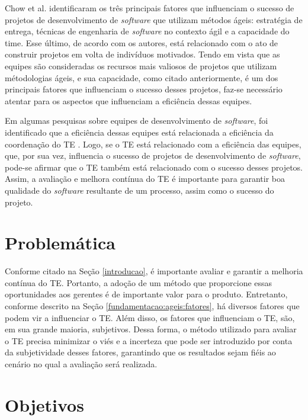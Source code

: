 Chow et al. \cite{chow} identificaram os três principais fatores que influenciam o sucesso de projetos de desenvolvimento de \textit{software} que utilizam métodos ágeis: estratégia de entrega, técnicas de engenharia de \textit{software} no contexto ágil e a capacidade do time. Esse último, de acordo com os autores, está relacionado com o ato de construir projetos em volta de indivíduos motivados. Tendo em vista que as equipes são consideradas os recursos mais valiosos de projetos que utilizam métodologias ágeis, e sua capacidade, como citado anteriormente, é um dos principais fatores que influenciam o sucesso desses projetos, faz-se necessário atentar para os aspectos que influenciam a eficiência dessas equipes.

Em algumas pesquisas sobre equipes de desenvolvimento de \textit{software}, foi identificado que a eficiência dessas equipes está relacionada a eficiência da coordenação do TE \cite{kraut} \cite{hoegl}. Logo, se o TE está relacionado com a eficiência das equipes, que, por sua vez, influencia o sucesso de projetos de desenvolvimento de \textit{software}, pode-se afirmar que o TE também está relacionado com o sucesso desses projetos. Assim, a avaliação e melhora contínua do TE é importante para garantir boa qualidade do \textit{software} resultante de um processo, assim como o sucesso do projeto.

\section{Problemática}
\label{introducao:problematica}

Conforme citado na Seção \ref{introducao}, é importante avaliar e garantir a melhoria contínua do TE. Portanto, a adoção de um método que proporcione essas oportunidades aos gerentes é de importante valor para o produto. Entretanto, conforme descrito na Seção \ref{fundamentacao:ageis:fatores}, há diversos fatores que podem vir a influenciar o TE. Além disso, os fatores que influenciam o TE, são, em sua grande maioria, subjetivos. Dessa forma, o método utilizado para avaliar o TE precisa minimizar o viés e a incerteza que pode ser introduzido por conta da subjetividade desses fatores, garantindo que os resultados sejam fiéis ao cenário no qual a avaliação será realizada.

\section{Objetivos}
\label{introducao:objetivos}

